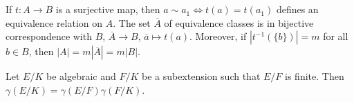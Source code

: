 \chapter{}

If $t\colon A\to B$ is a surjective map, then 
$a\sim a_1\Longleftrightarrow t(a)=t(a_1)$ 
defines an equivalence relation on $A$. The set $\overline{A}$ 
of equivalence classes is in bijective correspondence with $B$,
$\overline{A}\to B$, $\overline{a}\mapsto t(a)$. 
Moreover, if $|t^{-1}(\{b\})|=m$ for all $b\in B$, then 
$|A|=m|\overline{A}|=m|B|$. 

\begin{proposition}
    Let $E/K$ be algebraic and $F/K$ be a subextension such that 
    $E/F$ is finite. Then $\gamma(E/K)=\gamma(E/F)\gamma(F/K)$. 
\end{proposition}

